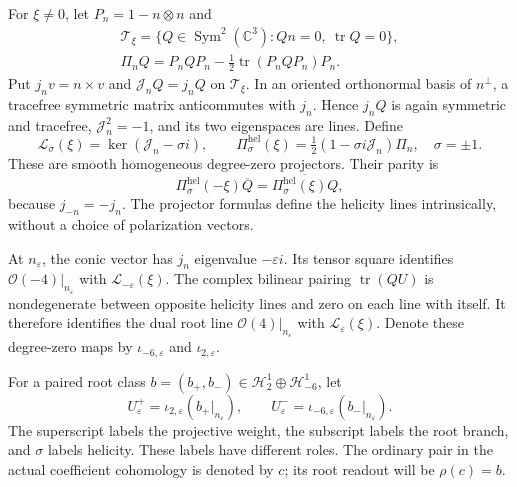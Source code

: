 \documentclass[
  english,
  11pt,
  reqno]{amsart}
\begin{document}
For \(\xi\ne0\), let \(P_n=1-n\otimes n\) and \[
\begin{gathered}
\mathcal T_\xi=
\{Q\in\operatorname{Sym}^2(\mathbb C^3):Qn=0,\ \operatorname{tr}Q=0\}, \\
\Pi_nQ=P_nQP_n-\tfrac12\operatorname{tr}(P_nQP_n)P_n.
\end{gathered}
\] Put \(j_n v=n\times v\) and \(\mathcal J_nQ=j_nQ\) on
\(\mathcal T_\xi\). In an oriented orthonormal basis of \(n^\perp\), a
tracefree symmetric matrix anticommutes with \(j_n\). Hence \(j_nQ\) is
again symmetric and tracefree, \(\mathcal J_n^2=-1\), and its two
eigenspaces are lines. Define%
 \[
\mathcal L_\sigma(\xi)=\ker(\mathcal J_n-\sigma i),
\qquad
\Pi^{\mathrm{hel}}_\sigma(\xi)
=\tfrac12(1-\sigma i\mathcal J_n)\Pi_n,
\quad \sigma=\pm1.
\] These are smooth homogeneous degree-zero projectors. Their parity is%
 \[
\Pi^{\mathrm{hel}}_\sigma(-\xi)\overline Q
=\overline{\Pi^{\mathrm{hel}}_\sigma(\xi)Q},
\] because \(j_{-n}=-j_n\). The projector formulas define the helicity
lines intrinsically, without a choice of polarization vectors.

At \(n_\varepsilon\), the conic vector has \(j_n\) eigenvalue
\(-\varepsilon i\). Its tensor square identifies
\(\mathcal O(-4)|_{n_\varepsilon}\) with
\(\mathcal L_{-\varepsilon}(\xi)\). The complex bilinear pairing
\(\operatorname{tr}(QU)\) is nondegenerate between opposite helicity
lines and zero on each line with itself. It therefore identifies the
dual root line \(\mathcal O(4)|_{n_\varepsilon}\) with
\(\mathcal L_\varepsilon(\xi)\). Denote these degree-zero maps by
\(\iota_{-6,\varepsilon}\) and \(\iota_{2,\varepsilon}\).

For a paired root class
\(b=(b_+,b_-)\in\mathscr H_2^1\oplus\mathscr H_{-6}^1\), let%
 \[
U^+_\varepsilon=\iota_{2,\varepsilon}(b_+|_{n_\varepsilon}),
\qquad
U^-_\varepsilon=\iota_{-6,\varepsilon}(b_-|_{n_\varepsilon}).
\] The superscript labels the projective weight, the subscript labels
the root branch, and \(\sigma\) labels helicity. These labels have
different roles. The ordinary pair in the actual coefficient cohomology
is denoted by \(c\); its root readout will be \(\rho(c)=b\).
\end{document}

